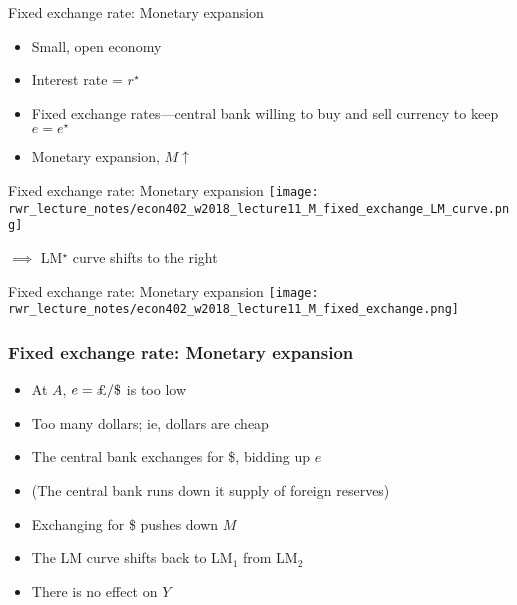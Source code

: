 \documentclass[presentation,dvipsnames]{beamer}
\renewcommand{\pounds}{\text{\textsterling}{ }}
\begin{document}
\begin{frame}[label=sec-6-2]{Fixed exchange rate: Monetary expansion}
\begin{itemize}[label={--}]
\item Small, open economy
\item Interest rate = $r^{\star}$
\item Fixed exchange rates---central bank willing to buy and sell currency to keep $e = e^{\star}$
\item Monetary expansion, $M \uparrow$
\end{itemize}
\end{frame}
\begin{frame}[label=sec-6-2]{Fixed exchange rate: Monetary expansion}
\texttt{[image: rwr\_lecture\_notes/econ402\_w2018\_lecture11\_M\_fixed\_exchange\_LM\_curve.png]}

$\implies$ LM$^{\star}$ curve shifts to the right

\end{frame}
\begin{frame}[label=sec-6-2]{Fixed exchange rate: Monetary expansion}
\texttt{[image: rwr\_lecture\_notes/econ402\_w2018\_lecture11\_M\_fixed\_exchange.png]}
\end{frame}
\begin{frame}
\frametitle{Fixed exchange rate: Monetary expansion}
\begin{itemize}[label={--}]
\item At $A$, $e = \pounds / \$ $ is too low
\item Too many dollars; ie, dollars are cheap
\item The central bank exchanges \pounds for \$, bidding up $e$
\item (The central bank runs down it supply of foreign reserves)
\item Exchanging \pounds for \$ pushes down $M$
\item The LM curve shifts back to LM$_{1}$ from LM$_{2}$
\item \textcolor{RubineRed}{There is no effect on $Y$}
\end{itemize}
\end{frame}
\end{document}
